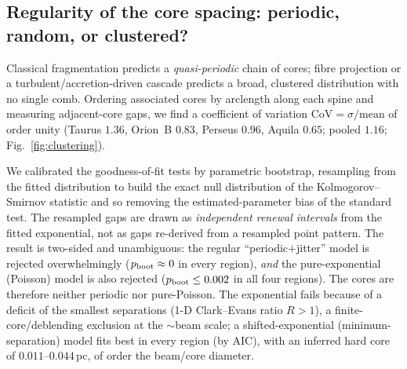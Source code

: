 \documentclass[usenatbib,twoside,twocolumn]{mnras}
\begin{document}
\subsection{Regularity of the core spacing: periodic, random, or clustered?}
\label{sec:clustering}
Classical fragmentation predicts a \emph{quasi-periodic} chain of cores; fibre projection or a turbulent/accretion-driven cascade predicts a broad, clustered distribution with no single comb. Ordering associated cores by arclength along each spine and measuring adjacent-core gaps, we find a coefficient of variation $\mathrm{CoV}=\sigma/\mathrm{mean}$ of order unity (Taurus $1.36$, Orion~B $0.83$, Perseus $0.96$, Aquila $0.65$; pooled $1.16$; Fig.~\ref{fig:clustering}).

We calibrated the goodness-of-fit tests by parametric bootstrap, resampling from the fitted distribution to build the exact null distribution of the Kolmogorov--Smirnov statistic and so removing the estimated-parameter bias of the standard test. The resampled gaps are drawn as \emph{independent renewal intervals} from the fitted exponential, not as gaps re-derived from a resampled point pattern. The result is two-sided and unambiguous: the regular ``periodic$+$jitter'' model is rejected overwhelmingly ($p_{\rm boot}\approx0$ in every region), \emph{and} the pure-exponential (Poisson) model is also rejected ($p_{\rm boot}\leq0.002$ in all four regions). The cores are therefore neither periodic nor pure-Poisson. The exponential fails because of a deficit of the smallest separations (1-D Clark--Evans ratio $R>1$), a finite-core/deblending exclusion at the $\sim$beam scale; a shifted-exponential (minimum-separation) model fits best in every region (by AIC), with an inferred hard core of $0.011$--$0.044$\,pc, of order the beam/core diameter.
\end{document}
